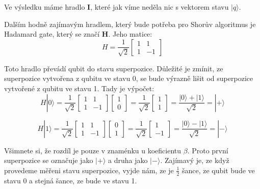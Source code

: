 \documentclass[11pt]{article}
\begin{document}
\par Ve výsledku máme hradlo \textbf{I}, které jak víme neděla nic s vektorem stavu $|q\rangle$.
\par Dalším hodně zajímavým hradlem, který bude potřeba pro Shorův algoritmus je Hadamard gate, který se značí \textbf{H}. Jeho matice:
$$H = \frac{1}{\sqrt{2}}\begin{bmatrix}
        1 & 1  \\
        1 & -1
    \end{bmatrix}$$
\par Toto hradlo převádí qubit do stavu superpozice. Důležité je zmínit, ze superpozice vytvořena z qubitu ve stavu 0, se bude výrazně lišit od superpozice vytvořené z qubitu ve stavu 1.
Tady je výpočet:
$$H|0\rangle = \frac{1}{\sqrt{2}}\begin{bmatrix}
        1 & 1  \\
        1 & -1
    \end{bmatrix}\begin{bmatrix}
        1 \\
        0
    \end{bmatrix} = \frac{1}{\sqrt{2}}\begin{bmatrix}
        1 \\
        1
    \end{bmatrix} = \frac{|0\rangle + |1\rangle}{\sqrt{2}} = |+\rangle$$

$$H|1\rangle = \frac{1}{\sqrt{2}}\begin{bmatrix}
        1 & 1  \\
        1 & -1
    \end{bmatrix}\begin{bmatrix}
        0 \\
        1
    \end{bmatrix} = \frac{1}{\sqrt{2}}\begin{bmatrix}
        1 \\
        -1
    \end{bmatrix} = \frac{|0\rangle - |1\rangle}{\sqrt{2}} = |-\rangle$$

\par Všimnete si, že rozdíl je pouze v znaménku u koeficientu $\beta$. Proto první superpozice se označuje jako $|+\rangle$ a druha jako $|-\rangle$.
Zajímavý je, ze když provedeme měřeni stavu superpozice, vyjde nám, ze je $\frac{1}{2}$ šance, ze qubit bude ve stavu 0 a stejná šance, ze bude ve stavu 1.
\end{document}
